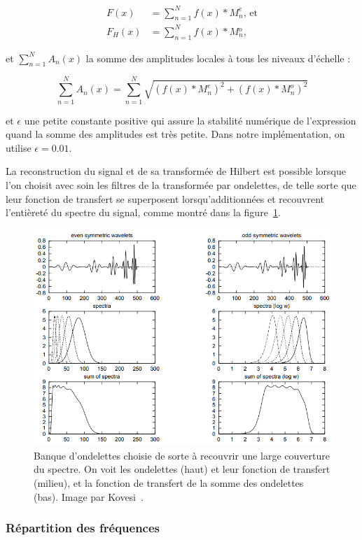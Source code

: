 \begin{align}
    F(x) &= \sum_{n=1}^{N} f(x)*M_n^e, \,\text{et}\\
    F_H(x) &= \sum_{n=1}^{N} f(x)*M{_n^o},
\end{align}

et $\sum_{n=1}^{N} A_n(x)$ la somme des amplitudes locales à tous les niveaux d'échelle :

\begin{equation}
    \sum_{n=1}^{N} A_n(x) = \sum_{n=1}^{N} \sqrt{(f(x)*M^e_n)^2 + (f(x)*M^o_n)^2}
\end{equation}

et $\epsilon$ une petite constante positive qui assure la stabilité numérique de l'expression quand la somme des amplitudes est très petite. Dans notre implémentation, on utilise $\epsilon = 0.01$.

La reconstruction du signal et de sa transformée de Hilbert est possible lorsque l'on choisit avec soin les filtres de la transformée par ondelettes, de telle sorte que leur fonction de transfert se superposent lorsqu'additionnées et recouvrent l'entièreté du spectre du signal, comme montré dans la figure~\ref{fig:wavelet-spectrum-coverage}.

\begin{figure}
           \centering
           \includegraphics[width=.60\textwidth]{contenu/resources/images/wavelet_spectrum_coverage}
           \caption[Choix des ondelettes pour recouvrir le spectre et permettre la reconstruction du signal]{Banque d'ondelettes choisie de sorte à recouvrir une large couverture du spectre. On voit les ondelettes (haut) et leur fonction de transfert (milieu), et la fonction de transfert de la somme des ondelettes (bas). Image par Kovesi~\cite{kovesi_image_1995}.}
           \label{fig:wavelet-spectrum-coverage}
\end{figure}

\subsubsection{Répartition des fréquences}

